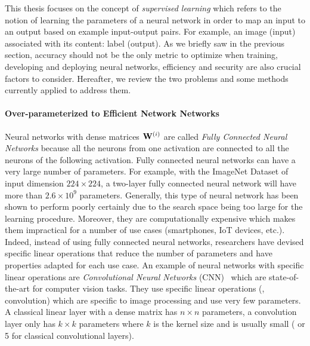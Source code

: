 This thesis focuses on the concept of \emph{supervised learning} which refers to the notion of learning the parameters of a neural network in order to map an input to an output based on example input-output pairs.
For example, an image (input) associated with its content: label (output).
As we briefly saw in the previous section, accuracy should not be the only metric to optimize when training, developing and deploying neural networks, efficiency and security are also crucial factors to consider.
Hereafter, we review the two problems and some methods currently applied to address them. 

\paragraph{Over-parameterized to Efficient Network Networks}
Neural networks with dense matrices $\mathbf{W}^{(i)}$ are called \emph{Fully Connected Neural Networks} because all the neurons from one activation are connected to all the neurons of the following activation.
Fully connected neural networks can have a very large number of parameters.
For example, with the ImageNet Dataset of input dimension $224 \times 224$, a two-layer fully connected neural network will have more than $2.6 \times 10^9$ parameters.
Generally, this type of neural network has been shown to perform poorly certainly due to the search space being too large for the learning procedure.
Moreover, they are computationally expensive which makes them impractical for a number of use cases (smartphones, IoT devices, etc.).
Indeed, instead of using fully connected neural networks, researchers have devised specific linear operations that reduce the number of parameters and have properties adapted for each use case. 
An example of neural networks with specific linear operations are \emph{Convolutional Neural Networks} (CNN)~\cite{lecun1998gradient,krizhevsky2012imagenet,he2016deep,tan2019efficientnet} which are state-of-the-art for computer vision tasks.
They use specific linear operations (\eg, convolution) which are specific to image processing and use very few parameters.  
A classical linear layer with a dense matrix has $n \times n$ parameters, a convolution layer only has $k \times k$ parameters where $k$ is the kernel size and is usually small ( or 5 for classical convolutional layers).


